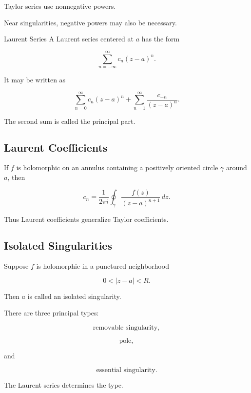 Taylor series use nonnegative powers.

Near singularities, negative powers may also be necessary.

\begin{definitionbox}{Laurent Series}
A Laurent series centered at \(a\) has the form

\[
\boxed{
\sum_{n=-\infty}^{\infty}
c_n(z-a)^n.
}
\]
\end{definitionbox}

It may be written as

\[
\boxed{
\sum_{n=0}^{\infty}
c_n(z-a)^n
+
\sum_{n=1}^{\infty}
\frac{c_{-n}}{(z-a)^n}.
}
\]

The second sum is called the principal part.

\subsection{Laurent Coefficients}
\label{subsec:laurent-coefficients}

If \(f\) is holomorphic on an annulus containing a positively oriented
circle \(\gamma\) around \(a\), then

\[
\boxed{
c_n
=
\frac{1}{2\pi i}
\oint_\gamma
\frac{f(z)}
{(z-a)^{n+1}}
\,dz.
}
\]

Thus Laurent coefficients generalize Taylor coefficients.

\subsection{Isolated Singularities}
\label{subsec:isolated-singularities}

Suppose \(f\) is holomorphic in a punctured neighborhood

\[
0<|z-a|<R.
\]

Then \(a\) is called an isolated singularity.

There are three principal types:

\[
\boxed{
\text{removable singularity},
}
\]

\[
\boxed{
\text{pole},
}
\]

and

\[
\boxed{
\text{essential singularity}.
}
\]

The Laurent series determines the type.

